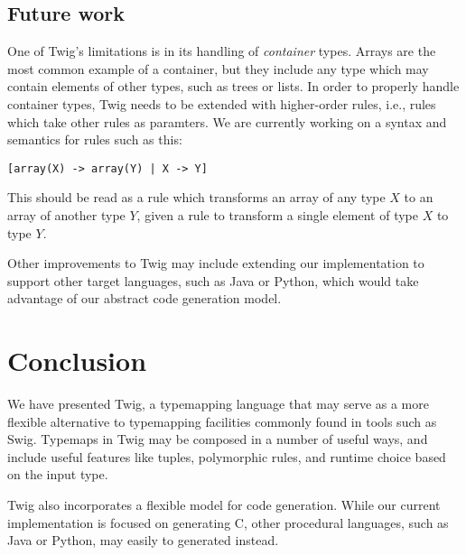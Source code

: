 
\subsection{Future work}

One of Twig's limitations is in its handling of \emph{container} types. Arrays are the most common example of a container, but they include any type which may contain elements of other types, such as trees or lists. In order to properly handle container types, Twig needs to be extended with higher-order rules, i.e., rules which take other rules as paramters. We are currently working on a syntax and semantics for rules such as this:

\begin{verbatim}
[array(X) -> array(Y) | X -> Y]
\end{verbatim}

This should be read as a rule which transforms an array of any type $X$ to an array of another type $Y$, given a rule to transform a single element of type $X$ to type $Y$.

Other improvements to Twig may include extending our implementation to support other target languages, such as Java or Python, which would take advantage of our abstract code generation model.

\section{Conclusion}

We have presented Twig, a typemapping language that may serve as a more flexible alternative to typemapping facilities commonly found in tools such as Swig. Typemaps in Twig may be composed in a number of useful ways, and include useful features like tuples, polymorphic rules, and runtime choice based on the input type.

Twig also incorporates a flexible model for code generation. While our current implementation is focused on generating C, other procedural languages, such as Java or Python, may easily to generated instead.
